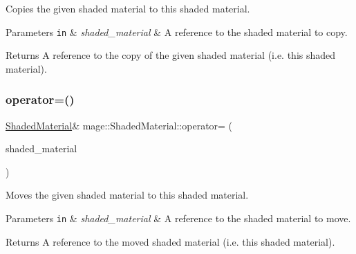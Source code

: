 Copies the given shaded material to this shaded material.


\begin{DoxyParams}[1]{Parameters}
\mbox{\tt in}  & {\em shaded\+\_\+material} & A reference to the shaded material to copy. \\
\hline
\end{DoxyParams}
\begin{DoxyReturn}{Returns}
A reference to the copy of the given shaded material (i.\+e. this shaded material). 
\end{DoxyReturn}
\hypertarget{structmage_1_1_shaded_material_a29fb482ab140fcb47709ffda03a67714}{}\label{structmage_1_1_shaded_material_a29fb482ab140fcb47709ffda03a67714} 
\subsubsection{\texorpdfstring{operator=()}{operator=()}\hspace{0.1cm}{\footnotesize\ttfamily [2/2]}}
{\footnotesize\ttfamily \hyperlink{structmage_1_1_shaded_material}{Shaded\+Material}\& mage\+::\+Shaded\+Material\+::operator= (\begin{DoxyParamCaption}\item[{\hyperlink{structmage_1_1_shaded_material}{Shaded\+Material} \&\&}]{shaded\+\_\+material }\end{DoxyParamCaption})\hspace{0.3cm}{\ttfamily [default]}}

Moves the given shaded material to this shaded material.


\begin{DoxyParams}[1]{Parameters}
\mbox{\tt in}  & {\em shaded\+\_\+material} & A reference to the shaded material to move. \\
\hline
\end{DoxyParams}
\begin{DoxyReturn}{Returns}
A reference to the moved shaded material (i.\+e. this shaded material). 
\end{DoxyReturn}
\hypertarget{structmage_1_1_shaded_material_ac72e210920e4ce6d84084106bb7d50c9}{}\label{structmage_1_1_shaded_material_ac72e210920e4ce6d84084106bb7d50c9} 
